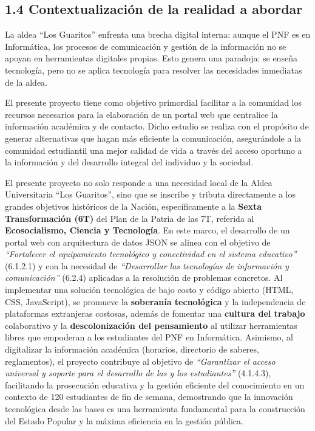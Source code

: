 \documentclass[12pt, letterpaper]{article}
\begin{document}
	\subsection*{1.4 Contextualización de la realidad a abordar}
	
	La aldea “Los Guaritos” enfrenta una brecha digital interna: aunque el PNF es en Informática, los procesos de comunicación y gestión de la información no se apoyan en herramientas digitales propias. Esto genera una paradoja: se enseña tecnología, pero no se aplica tecnología para resolver las necesidades inmediatas de la aldea.
	
	El presente proyecto tiene como objetivo primordial facilitar a la comunidad los recursos necesarios para la elaboración de un portal web que centralice la información académica y de contacto. Dicho estudio se realiza con el propósito de generar alternativas que hagan más eficiente la comunicación, asegurándole a la comunidad estudiantil una mejor calidad de vida a través del acceso oportuno a la información y del desarrollo integral del individuo y la sociedad.
	
	El presente proyecto no solo responde a una necesidad local de la Aldea Universitaria “Los Guaritos”, sino que se inscribe y tributa directamente a los grandes objetivos históricos de la Nación, específicamente a la \textbf{Sexta Transformación (6T)} del Plan de la Patria de las 7T, referida al \textbf{Ecosocialismo, Ciencia y Tecnología}. En este marco, el desarrollo de un portal web con arquitectura de datos JSON se alinea con el objetivo de \textit{“Fortalecer el equipamiento tecnológico y conectividad en el sistema educativo”} (6.1.2.1) y con la necesidad de \textit{“Desarrollar las tecnologías de información y comunicación”} (6.2.4) aplicadas a la resolución de problemas concretos. Al implementar una solución tecnológica de bajo costo y código abierto (HTML, CSS, JavaScript), se promueve la \textbf{soberanía tecnológica} y la independencia de plataformas extranjeras costosas, además de fomentar una \textbf{cultura del trabajo} colaborativo y la \textbf{descolonización del pensamiento} al utilizar herramientas libres que empoderan a los estudiantes del PNF en Informática. Asimismo, al digitalizar la información académica (horarios, directorio de saberes, reglamentos), el proyecto contribuye al objetivo de \textit{“Garantizar el acceso universal y soporte para el desarrollo de las y los estudiantes”} (4.1.4.3), facilitando la prosecución educativa y la gestión eficiente del conocimiento en un contexto de 120 estudiantes de fin de semana, demostrando que la innovación tecnológica desde las bases es una herramienta fundamental para la construcción del Estado Popular y la máxima eficiencia en la gestión pública.
	
\end{document}
